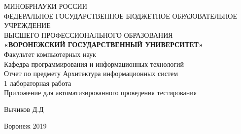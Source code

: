 \documentclass{article}
\begin{document}
    \begin{center}
    \hfill \break
    \large{МИНОБРНАУКИ РОССИИ}\\
    \footnotesize{ФЕДЕРАЛЬНОЕ ГОСУДАРСТВЕННОЕ БЮДЖЕТНОЕ ОБРАЗОВАТЕЛЬНОЕ УЧРЕЖДЕНИЕ}\\
    \footnotesize{ВЫСШЕГО ПРОФЕССИОНАЛЬНОГО ОБРАЗОВАНИЯ}\\
    \small{\textbf{«ВОРОНЕЖСКИЙ ГОСУДАРСТВЕННЫЙ УНИВЕРСИТЕТ»}}\\
    \hfill \break
    \normalsize{Факультет компьютерных наук}\\
    \hfill \break
    \normalsize{Кафедра программирования и информационных технологий}\\
    \hfill\break
    \hfill \break
    \hfill \break
    \hfill \break
    \large{Отчет по предмету Архитектура информационных систем
    \\1 лабораторная работа
    \\Приложение для автоматизированного проведения тестирования}\\
    \end{center}

    \hfill \break
    \hfill \break
    \hfill \break
    \hfill \break
    \hfill \break

    \begin{flushright} Вычиков Д.Д \end{flushright}
    \vspace*{\fill}
    \begin{center} Воронеж 2019 \end{center}
    \thispagestyle{empty}
    \newpage

    
    
\end{document}
